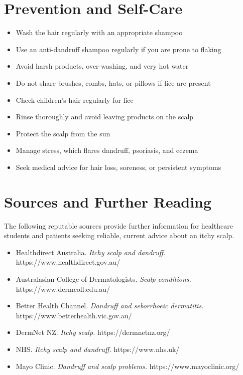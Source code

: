 \section*{Prevention and Self-Care}
\begin{itemize}
    \item Wash the hair regularly with an appropriate shampoo
    \item Use an anti-dandruff shampoo regularly if you are prone to flaking
    \item Avoid harsh products, over-washing, and very hot water
    \item Do not share brushes, combs, hats, or pillows if lice are present
    \item Check children's hair regularly for lice
    \item Rinse thoroughly and avoid leaving products on the scalp
    \item Protect the scalp from the sun
    \item Manage stress, which flares dandruff, psoriasis, and eczema
    \item Seek medical advice for hair loss, soreness, or persistent symptoms
\end{itemize}

\section*{Sources and Further Reading}
The following reputable sources provide further information for healthcare students and patients seeking reliable, current advice about an itchy scalp.
\begin{itemize}
    \item Healthdirect Australia. \textit{Itchy scalp and dandruff.} https://www.healthdirect.gov.au/
    \item Australasian College of Dermatologists. \textit{Scalp conditions.} https://www.dermcoll.edu.au/
    \item Better Health Channel. \textit{Dandruff and seborrhoeic dermatitis.} https://www.betterhealth.vic.gov.au/
    \item DermNet NZ. \textit{Itchy scalp.} https://dermnetnz.org/
    \item NHS. \textit{Itchy scalp and dandruff.} https://www.nhs.uk/
    \item Mayo Clinic. \textit{Dandruff and scalp problems.} https://www.mayoclinic.org/
\end{itemize}
